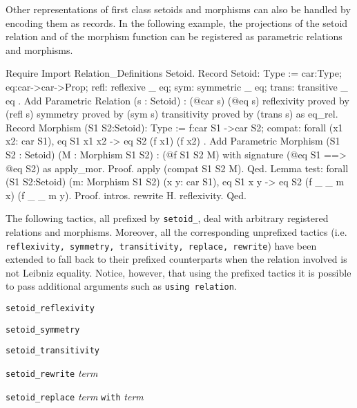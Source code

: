 Other representations of first class setoids and morphisms can also
be handled by encoding them as records. In the following example,
the projections of the setoid relation and of the morphism function 
can be registered as parametric relations and morphisms.
\begin{cscexample}

\begin{coq_example*}
Require Import Relation_Definitions Setoid.
Record Setoid: Type :=
{ car:Type;
  eq:car->car->Prop;
  refl: reflexive _ eq;
  sym: symmetric _ eq;
  trans: transitive _ eq
}.
Add Parametric Relation (s : Setoid) : (@car s) (@eq s)
 reflexivity proved by (refl s)
 symmetry proved by (sym s)
 transitivity proved by (trans s) as eq_rel.
Record Morphism (S1 S2:Setoid): Type :=
{ f:car S1 ->car S2;
  compat: forall (x1 x2: car S1), eq S1 x1 x2 -> eq S2 (f x1) (f x2) }.
Add Parametric Morphism (S1 S2 : Setoid) (M : Morphism S1 S2) :
 (@f S1 S2 M) with signature (@eq S1 ==> @eq S2) as apply_mor.
Proof. apply (compat S1 S2 M). Qed.
Lemma test: forall (S1 S2:Setoid) (m: Morphism S1 S2)
 (x y: car S1), eq S1 x y -> eq S2 (f _ _ m x) (f _ _ m y).
Proof. intros. rewrite H. reflexivity. Qed.
\end{coq_example*}
\end{cscexample}

\label{setoidtactics}
The following tactics, all prefixed by \texttt{setoid\_}, 
deal with arbitrary
registered relations and morphisms. Moreover, all the corresponding unprefixed
tactics (i.e. \texttt{reflexivity, symmetry, transitivity, replace, rewrite})
have been extended to fall back to their prefixed counterparts when
the relation involved is not Leibniz equality. Notice, however, that using
the prefixed tactics it is possible to pass additional arguments such as
\texttt{using relation}.
\medskip

\texttt{setoid\_reflexivity}

\texttt{setoid\_symmetry} 

\texttt{setoid\_transitivity}

\texttt{setoid\_rewrite}  \textit{term}
~ ~

\texttt{setoid\_replace} \textit{term} \texttt{with} \textit{term}
~
~
~
\medskip

